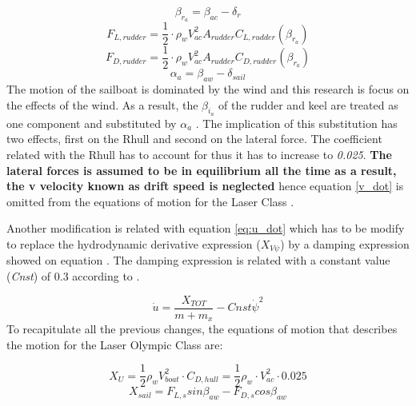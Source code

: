 \begin{equation} \label{eq:angle_attack_rudder}
    \beta_{r_{a}} = \beta_{ac} - \delta_{r}
\end{equation}
\begin{equation} \label{eq:rudder_lift}
    F_{L,rudder}=\frac{1}{2} \cdot \rho_{w} V_{ac}^2 A_{rudder}C_{L,rudder}(\beta_{r_{a}})
\end{equation}
\begin{equation} \label{eq:rudder_drag}
    F_{D,rudder}=\frac{1}{2} \cdot \rho_{w} V_{ac}^2 A_{rudder}C_{D,rudder}(\beta_{r_{a}})
\end{equation}
\begin{equation} \label{eq:angle_attack_sail}
    \alpha_{a} = \beta_{aw} - \delta_{sail}
\end{equation}
The motion of the sailboat is dominated by the wind and this research is focus on the effects of the wind. As a result, the $\beta_{i_{a}}$ of the rudder and keel are treated as one component and substituted by $\alpha_{a}$ \cite{rein2012tra}. The implication of this substitution has two effects, first on the \acrshort{Rhull} and second on the lateral force. The coefficient related with the \acrshort{Rhull} has to account for thus it has to increase to \textit{0.025}. \textbf{The lateral forces is assumed to be in equilibrium all the time as a result, the \acrshort{v} velocity known as drift speed is neglected} hence equation \ref{v_dot} is omitted from the equations of motion for the Laser Class \cite{rein2012tra}.\par  
Another modification is related with equation \ref{eq:u_dot} which has to be modify to replace the hydrodynamic derivative expression ($X_{V\psi}$) by a damping expression showed on equation \label{eq:u_dotLaser}. The damping expression is related with a constant value  (\textit{Cnst}) of 0.3 according to \cite{rein2012tra}. \par
\begin{equation} \label{eq:u_dotLaserM}
    \Dot{u}=\frac{X_{TOT}}{m+m_{x}}-Cnst \Dot{\psi}^2
\end{equation}
To recapitulate all the previous changes, the equations of motion that describes the motion for the Laser Olympic Class are: \par 
\begin{equation} \label{eq:X_uM}
    X_{U}=\frac{1}{2}\rho_{w}V_{boat}^2 \cdot C_{D,hull}=\frac{1}{2}\rho_{w} \cdot V_{ac}^2 \cdot 0.025 
\end{equation}
\begin{equation}\label{eq:X_sailM}
       X_{sail}=F_{L,s}sin\beta_{aw}-F_{D,s}cos\beta_{aw} 
\end{equation}
